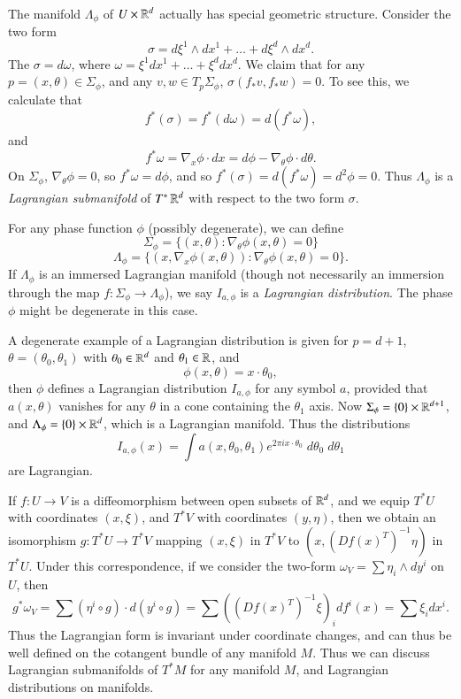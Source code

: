 The manifold $\Lambda_\phi$ of $U \times \operatorname{\mathbb{R}}^d$ actually has special geometric structure. Consider the two form
%
\[ \sigma = d\xi^1 \wedge dx^1 + \dots + d\xi^d \wedge dx^d. \]
%
The $\sigma = d\omega$, where $\omega = \xi^1 dx^1 + \dots + \xi^d dx^d$. We claim that for any $p =(x,\theta) \in \Sigma_\phi$, and any $v,w \in T_p \Sigma_\phi$, $\sigma(f_* v, f_* w) = 0$. To see this, we calculate that
%
\[ f^*(\sigma) = f^*(d \omega) = d(f^* \omega), \]
%
and
%
\[ f^* \omega = \nabla_x \phi \cdot dx = d \phi - \nabla_\theta \phi \cdot d\theta. \]
%
On $\Sigma_\phi$, $\nabla_\theta \phi = 0$, so $f^* \omega = d \phi$, and so $f^*(\sigma) = d(f^* \omega) = d^2 \phi = 0$. Thus $\Lambda_\phi$ is a \emph{Lagrangian submanifold} of $T^* \operatorname{\mathbb{R}}^d$ with respect to the two form $\sigma$.

For any phase function $\phi$ (possibly degenerate), we can define
%
\[ \Sigma_\phi = \{ (x,\theta): \nabla_\theta \phi(x,\theta) = 0 \} \]
%
\[ \Lambda_\phi = \{ (x,\nabla_x \phi(x,\theta)) : \nabla_\theta \phi(x,\theta) = 0 \}. \]
%
If $\Lambda_\phi$ is an immersed Lagrangian manifold (though not necessarily an immersion through the map $f: \Sigma_\phi \to \Lambda_\phi$), we say $I_{a,\phi}$ is a \emph{Lagrangian distribution}. The phase $\phi$ might be degenerate in this case.

\begin{example}
    A degenerate example of a Lagrangian distribution is given for $p = d + 1$, $\theta = (\theta_0, \theta_1)$ with $\theta_0 \in \operatorname{\mathbb{R}}^d$ and $\theta_1 \in \operatorname{\mathbb{R}}$, and
    \[ \phi(x,\theta) = x \cdot \theta_0, \]
    then $\phi$ defines a Lagrangian distribution $I_{a,\phi}$ for any symbol $a$, provided that $a(x,\theta)$ vanishes for any $\theta$ in a cone containing the $\theta_1$ axis. Now $\Sigma_\phi = \{ 0 \} \times \operatorname{\mathbb{R}}^{d+1}$, and $\Lambda_\phi = \{ 0 \} \times \operatorname{\mathbb{R}}^d$, which is a Lagrangian manifold. Thus the distributions
    \[ I_{a,\phi}(x) = \int a(x,\theta_0,\theta_1) e^{2 \pi i x \cdot \theta_0}\; d\theta_0\; d\theta_1 \]
    are Lagrangian.
\end{example}

If $f: U \to V$ is a diffeomorphism between open subsets of $\operatorname{\mathbb{R}}^d$, and we equip $T^* U$ with coordinates $(x,\xi)$, and $T^* V$ with coordinates $(y,\eta)$, then we obtain an isomorphism $g: T^* U \to T^* V$ mapping $(x,\xi)$ in $T^* V$ to $(x, (Df(x)^T)^{-1} \eta)$ in $T^* U$. Under this correspondence, if we consider the two-form $\omega_V = \sum \eta_i \wedge dy^i$ on $U$, then
%
\[ g^* \omega_V = \sum (\eta^i \circ g) \cdot d(y^i \circ g) = \sum ((Df(x)^T)^{-1} \xi)_i df^i(x) = \sum \xi_i dx^i. \]
%
Thus the Lagrangian form is invariant under coordinate changes, and can thus be well defined on the cotangent bundle of any manifold $M$. Thus we can discuss Lagrangian submanifolds of $T^* M$ for any manifold $M$, and Lagrangian distributions on manifolds.


